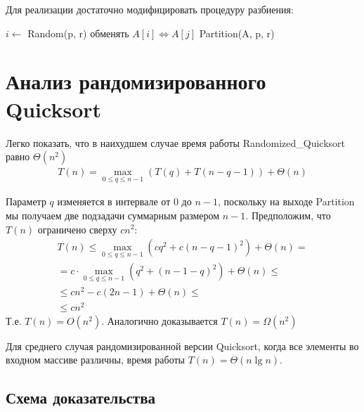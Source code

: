 \documentclass[11pt]{article}
\begin{document}
Для реализации достаточно модифицировать процедуру разбиения:
\begin{codebox}
\li	$i \gets $ Random(p, r)
\li	обменять $A[i] \iff A[j]$
\li	\Return Partition(A, p, r)
\End
\end{codebox}

\section{Анализ рандомизированного Quicksort}

Легко показать, что в наихудшем случае время работы Randomized\_Quicksort равно $\Theta(n^2)$
\begin{align*}
T(n) = \max_{0 \leqslant q \leqslant n-1} (T(q) + T(n-q-1)) + \Theta(n)
\end{align*}

Параметр $q$ изменяется в интервале от 0 до $n-1$, поскольку на выходе Partition мы получаем
две подзадачи суммарным размером $n-1$. Предположим, что $T(n)$ ограничено сверху $cn^2$:
\begin{align*}
T(n) \leqslant \max_{0 \leqslant q \leqslant n-1} (cq^2 + c(n - q -1)^2) + \Theta(n) = \\
= c \cdot \max_{0 \leqslant q \leqslant n-1} (q^2 + (n-1-q)^2) +\Theta(n) \leqslant \\
\leqslant cn^2 - c(2n -1) + \Theta(n) \leqslant \\
\leqslant cn^2
\end{align*}
Т.е. $T(n) = O(n^2)$. Аналогично доказывается $T(n) = \Omega(n^2)$

Для среднего случая рандомизированной версии Quicksort, когда все элементы во входном
массиве различны, время работы $T(n) = \Theta(n \lg n)$.

\subsection{Схема доказательства}
\end{document}
